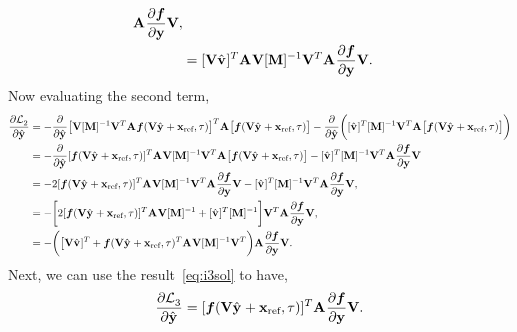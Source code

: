 \documentclass[3p,computermodern,10pt]{elsarticle}
\begin{document}
\begin{appendices}
\begin{align*}
\mathbf{A}^{} \frac{\partial \boldsymbol f}{\partial \mathbf{y}} \mathbf {V} , \\
&= 
[\mathbf {V} \hat{\mathbf{v}}^{} ]^T   \mathbf{A}^{}   \mathbf {V}  [\mathbf{M}]^{-1}\mathbf {V}^T
\mathbf{A}^{} \frac{\partial \boldsymbol f}{\partial \mathbf{y}} \mathbf {V} .
\end{align*}
Now evaluating the second term,
\begin{align*}
\frac{\partial  \mathcal{L}^{}_2 }{\partial \hat{\mathbf{y}}^{}{}} &= 
-\frac{\partial  }{\partial \hat{\mathbf{y}}^{}{}}   \big[ \mathbf {V}  [\mathbf{M}]^{-1}\mathbf {V}^T
\mathbf{A}^{}  \boldsymbol f(\mathbf {V} \hat{\mathbf{y}}^{} + \mathbf{x}_\text{ref},\tau) \big]^T \mathbf{A}^{} \big[ \boldsymbol f(\mathbf {V} \hat{\mathbf{y}}^{} + \mathbf{x}_\text{ref},\tau) \big]  - \frac{\partial  }{\partial \hat{\mathbf{y}}^{}{}} \bigg( [\hat{\mathbf{v}}^{}]^T[\mathbf{M}]^{-1} \mathbf {V}^T \mathbf{A}^{} \big[ \boldsymbol f(\mathbf {V} \hat{\mathbf{y}}^{} + \mathbf{x}_\text{ref},\tau) \big]  \bigg)  \\&= 
-\frac{\partial  }{\partial \hat{\mathbf{y}}^{}{}}    [\boldsymbol f(\mathbf {V} \hat{\mathbf{y}}^{} + \mathbf{x}_\text{ref},\tau)]^T \mathbf{A}^{} \mathbf {V} [\mathbf{M}]^{-1} \mathbf {V}^T 
 \mathbf{A}^{} \big[ \boldsymbol f(\mathbf {V} \hat{\mathbf{y}}^{} + \mathbf{x}_\text{ref},\tau) \big]  - 
  [\hat{\mathbf{v}}^{}]^T[\mathbf{M}]^{-1} \mathbf {V}^T \mathbf{A}^{} \frac{\partial \boldsymbol f}{\partial \mathbf{y}} \mathbf {V} 
\\
&= 
- 2[\boldsymbol f(\mathbf {V} \hat{\mathbf{y}}^{} + \mathbf{x}_\text{ref},\tau)]^T \mathbf{A}^{} \mathbf {V} [\mathbf{M}]^{-1} \mathbf {V}^T \mathbf{A}^{}  
 \frac{\partial \boldsymbol f}{\partial \mathbf{y}} \mathbf {V} - 
 [\hat{\mathbf{v}}^{}]^T[\mathbf{M}]^{-1} \mathbf {V}^T \mathbf{A}^{} \frac{\partial \boldsymbol f}{\partial \mathbf{y}} \mathbf {V}, \\
&= - \bigg[ 2[\boldsymbol f(\mathbf {V} \hat{\mathbf{y}}^{} + \mathbf{x}_\text{ref},\tau)]^T  \mathbf{A}^{} \mathbf {V} [\mathbf{M}]^{-1}  + [\hat{\mathbf{v}}^{}]^T  [\mathbf{M}]^{-1} \bigg] \mathbf {V}^T \mathbf{A}^{} \frac{\partial \boldsymbol f}{\partial \mathbf{y}} \mathbf {V} ,\\
&= -\bigg( \big[ \mathbf {V} \hat{\mathbf{v}}^{} ]^T  + \boldsymbol f(\mathbf {V} \hat{\mathbf{y}}^{} + \mathbf{x}_\text{ref},\tau)^T  \mathbf{A}^{} \mathbf {V} [\mathbf{M}]^{-1} \mathbf {V}^T \bigg) \mathbf{A}^{} \frac{\partial \boldsymbol f}{\partial \mathbf{y}} \mathbf {V}. 
\end{align*}
Next, we can use the result~\eqref{eq:i3sol} to have,
$$ \frac{\partial  \mathcal{L}^{}_3 }{\partial \hat{\mathbf{y}}^{}{}} =
  [\boldsymbol f(\mathbf {V} \hat{\mathbf{y}}^{} + \mathbf{x}_\text{ref},\tau) ]^T  \mathbf{A}^{} \frac{\partial \boldsymbol f}{\partial \mathbf{y}} \mathbf {V}.
$$
\end{appendices}
\end{document}
